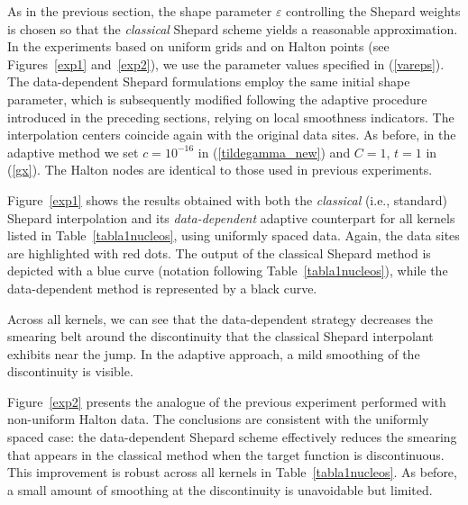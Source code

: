 \documentclass[preprint]{elsarticle}       %
\begin{document}
As in the previous section, the shape parameter $\varepsilon$ controlling the Shepard weights is chosen so that the \emph{classical} Shepard scheme yields a reasonable approximation. In the experiments based on uniform grids and on Halton points (see Figures~\ref{exp1} and~\ref{exp2}), we use the parameter values specified in (\ref{vareps}). The data-dependent Shepard formulations employ the same initial shape parameter, which is subsequently modified following the adaptive procedure introduced in the preceding sections, relying on local smoothness indicators. The interpolation centers coincide again with the original data sites. As before, in the adaptive method we set $c = 10^{-16}$ in (\ref{tildegamma_new}) and $C = 1$, $t = 1$ in (\ref{gx}). The Halton nodes are identical to those used in previous experiments.

Figure~\ref{exp1} shows the results obtained with both the \emph{classical} (i.e., standard) Shepard interpolation and its \emph{data-dependent} adaptive counterpart for all kernels listed in Table~\ref{tabla1nucleos}, using uniformly spaced data. Again, the data sites are highlighted with red dots. The output of the classical Shepard method is depicted with a blue curve (notation following Table~\ref{tabla1nucleos}), while the data-dependent method is represented by a black curve.

Across all kernels, we can see that the data-dependent strategy decreases the smearing belt around the discontinuity that the classical Shepard interpolant exhibits near the jump. In the adaptive approach, a mild smoothing of the discontinuity is visible. 

Figure~\ref{exp2} presents the analogue of the previous experiment performed with non-uniform Halton data. The conclusions are consistent with the uniformly spaced case: the data-dependent Shepard scheme effectively reduces the smearing that appears in the classical method when the target function is discontinuous. This improvement is robust across all kernels in Table~\ref{tabla1nucleos}. As before, a small amount of smoothing at the discontinuity is unavoidable but limited. 
\end{document}
